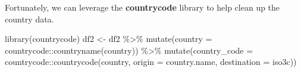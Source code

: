 \documentclass[
]{article}
\newenvironment{Shaded}{\begin{snugshade}}{\end{snugshade}}
\newcommand{\AttributeTok}[1]{\textcolor[rgb]{0.77,0.63,0.00}{#1}}
\newcommand{\FunctionTok}[1]{\textcolor[rgb]{0.00,0.00,0.00}{#1}}
\newcommand{\NormalTok}[1]{#1}
\newcommand{\OtherTok}[1]{\textcolor[rgb]{0.56,0.35,0.01}{#1}}
\newcommand{\SpecialCharTok}[1]{\textcolor[rgb]{0.00,0.00,0.00}{#1}}
\newcommand{\StringTok}[1]{\textcolor[rgb]{0.31,0.60,0.02}{#1}}
\begin{document}
Fortunately, we can leverage the \textbf{countrycode} library to help
clean up the country data.

\begin{Shaded}
\begin{Highlighting}[]
\FunctionTok{library}\NormalTok{(countrycode)}
\NormalTok{df2 }\OtherTok{\textless{}{-}}\NormalTok{ df2 }\SpecialCharTok{\%\textgreater{}\%}
        \FunctionTok{mutate}\NormalTok{(}\AttributeTok{country =}\NormalTok{ countrycode}\SpecialCharTok{::}\FunctionTok{countryname}\NormalTok{(country)) }\SpecialCharTok{\%\textgreater{}\%}
        \FunctionTok{mutate}\NormalTok{(}\AttributeTok{country\_code =}\NormalTok{ countrycode}\SpecialCharTok{::}\FunctionTok{countrycode}\NormalTok{(country, }\AttributeTok{origin =} \StringTok{\textquotesingle{}country.name\textquotesingle{}}\NormalTok{, }\AttributeTok{destination =} \StringTok{\textquotesingle{}iso3c\textquotesingle{}}\NormalTok{))}
\end{Highlighting}
\end{Shaded}
\end{document}
